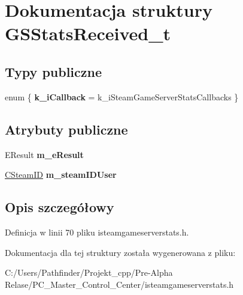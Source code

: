 \hypertarget{struct_g_s_stats_received__t}{}\section{Dokumentacja struktury G\+S\+Stats\+Received\+\_\+t}
\label{struct_g_s_stats_received__t}
\subsection*{Typy publiczne}
\begin{DoxyCompactItemize}
\item 
\mbox{\label{struct_g_s_stats_received__t_ac4cade346cdd3f992ac79c74ac950cc6}} 
enum \{ {\bfseries k\+\_\+i\+Callback} = k\+\_\+i\+Steam\+Game\+Server\+Stats\+Callbacks
 \}
\end{DoxyCompactItemize}
\subsection*{Atrybuty publiczne}
\begin{DoxyCompactItemize}
\item 
\mbox{\label{struct_g_s_stats_received__t_a66bbf5b83de26013cbc96e6a9e06b01a}} 
E\+Result {\bfseries m\+\_\+e\+Result}
\item 
\mbox{\label{struct_g_s_stats_received__t_ad44c9e2c30b7a5e804c1973075206303}} 
\hyperlink{class_c_steam_i_d}{C\+Steam\+ID} {\bfseries m\+\_\+steam\+I\+D\+User}
\end{DoxyCompactItemize}


\subsection{Opis szczegółowy}


Definicja w linii 70 pliku isteamgameserverstats.\+h.



Dokumentacja dla tej struktury została wygenerowana z pliku\+:\begin{DoxyCompactItemize}
\item 
C\+:/\+Users/\+Pathfinder/\+Projekt\+\_\+cpp/\+Pre-\/\+Alpha Relase/\+P\+C\+\_\+\+Master\+\_\+\+Control\+\_\+\+Center/isteamgameserverstats.\+h\end{DoxyCompactItemize}
